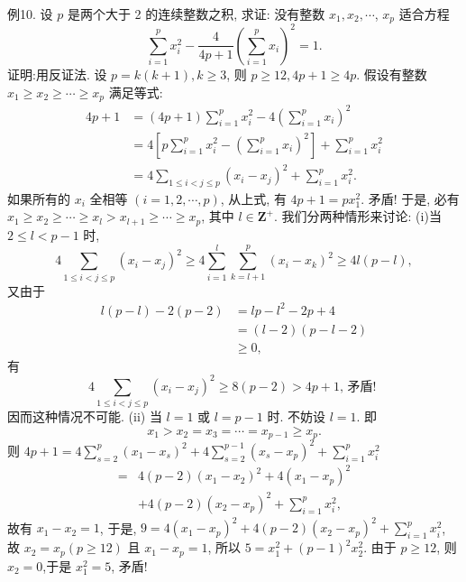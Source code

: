 例10. 设 $p$ 是两个大于 2 的连续整数之积, 求证: 没有整数 $x_1, x_2, \cdots$, $x_p$ 适合方程
$$
\sum_{i=1}^p x_i^2-\frac{4}{4 p+1}\left(\sum_{i=1}^p x_i\right)^2=1 .
$$
证明:用反证法.
设 $p=k(k+1), k \geqslant 3$, 则 $p \geqslant 12,4 p+1 \geqslant 4 p$.
假设有整数 $x_1 \geqslant x_2 \geqslant \cdots \geqslant x_p$ 满足等式:
$$
\begin{aligned}
4 p+1 & =(4 p+1) \sum_{i=1}^p x_i^2-4\left(\sum_{i=1}^p x_i\right)^2 \\
& =4\left[p \sum_{i=1}^p x_i^2-\left(\sum_{i=1}^p x_i\right)^2\right]+\sum_{i=1}^p x_i^2 \\
& =4 \sum_{1 \leqslant i<j \leqslant p}\left(x_i-x_j\right)^2+\sum_{i=1}^p x_i^2 .
\end{aligned}
$$
如果所有的 $x_i$ 全相等 $(i=1,2, \cdots, p)$, 从上式, 有 $4 p+1=p x_1^2$. 矛盾!
于是, 必有 $x_1 \geqslant x_2 \geqslant \cdots \geqslant x_l>x_{l+1} \geqslant \cdots \geqslant x_p$, 其中 $l \in \mathbf{Z}^{+}$. 我们分两种情形来讨论:
(i)当 $2 \leqslant l<p-1$ 时,
$$
4 \sum_{1 \leqslant i<j \leqslant p}\left(x_i-x_j\right)^2 \geqslant 4 \sum_{i=1}^l \sum_{k=l+1}^p\left(x_i-x_k\right)^2 \geqslant 4 l(p-l),
$$
又由于
$$
\begin{aligned}
l(p-l)-2(p-2) & =l p-l^2-2 p+4 \\
& =(l-2)(p-l-2) \\
& \geqslant 0,
\end{aligned}
$$
有
$$
4 \sum_{1 \leqslant i<j \leqslant p}\left(x_i-x_j\right)^2 \geqslant 8(p-2)>4 p+1 \text {, 矛盾! }
$$
因而这种情况不可能.
(ii) 当 $l=1$ 或 $l=p-1$ 时.
不妨设 $l=1$. 即
$$
x_1>x_2=x_3=\cdots=x_{p-1} \geqslant x_p .
$$
则 $4 p+1=4 \sum_{s=2}^p\left(x_1-x_s\right)^2+4 \sum_{s=2}^{p-1}\left(x_s-x_p\right)^2+\sum_{i=1}^p x_i^2$
$$
\begin{aligned}
= & 4(p-2)\left(x_1-x_2\right)^2+4\left(x_1-x_p\right)^2 \\
& +4(p-2)\left(x_2-x_p\right)^2+\sum_{i=1}^p x_i^2,
\end{aligned}
$$
故有 $x_1-x_2=1$, 于是, $9=4\left(x_1-x_p\right)^2+4(p-2)\left(x_2-x_p\right)^2+\sum_{i=1}^p x_i^2$, 故 $x_2=x_p(p \geqslant 12)$ 且 $x_1-x_p=1$, 所以 $5=x_1^2+(p-1)^2 x_2^2$.
由于 $p \geqslant 12$, 则 $x_2=0$,于是 $x_1^2=5$, 矛盾!



